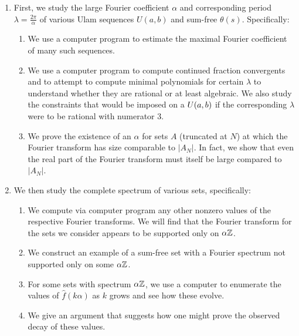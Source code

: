 \documentclass{report}
\theoremstyle{remark}
\numberwithin{equation}{section}
\begin{document}
\begin{enumerate}
\item First, we study the large Fourier coefficient $\alpha$ and
  corresponding period $\lambda = \frac{2\pi}{\alpha}$ of various Ulam
  sequences $U(a,b)$ and sum-free $\theta(s)$.  Specifically:
  \begin{enumerate}
  \item We use a computer program to estimate the maximal Fourier
    coefficient of many such sequences.
  \item We use a computer program to compute continued fraction
    convergents and to attempt to compute minimal polynomials for
    certain $\lambda$ to understand whether they are rational or at
    least algebraic.  We also study the constraints that would be
    imposed on a $U(a,b)$ if the corresponding $\lambda$ were to
    be rational with numerator 3.
  \item We prove the existence of an $\alpha$ for \relevant sets $A$
    (truncated at $N$) at which the Fourier transform has size
    comparable to $|A_N|$.  In fact, we show that even the real part
    of the Fourier transform must itself be large compared to $|A_N|$.
  \end{enumerate}

\item We then study the complete spectrum of various \relevant sets,
  specifically:
  \begin{enumerate}
  \item We compute via computer program any other nonzero values of
    the respective Fourier transforms.  We will find that the Fourier
    transform for the sets we consider appears to be supported only on
    $\alpha\mathbb{Z}$.
  \item We construct an example of a sum-free set with a Fourier
    spectrum not supported only on some $\alpha\mathbb{Z}$.
  \item For some \relevant sets with spectrum $\alpha\mathbb{Z}$, we use a
    computer to enumerate the values of $\widehat{f}(k\alpha)$ as $k$
    grows and see how these evolve.
  \item We give an argument that suggests how one might prove the
    observed decay of these values.
  \end{enumerate}


\end{enumerate}
\end{document}
